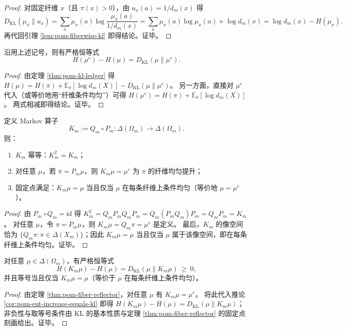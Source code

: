 \begin{proof}
对固定纤维 \(x\)（且 \(\pi(x)>0\)），由 \(u_x(a)=1/d_m(x)\) 得
\[
D_{\mathrm{KL}}(\mu_x\|u_x)
=\sum_{a}\mu_x(a)\log\frac{\mu_x(a)}{1/d_m(x)}
=\sum_a \mu_x(a)\log\mu_x(a)+\log d_m(x)
=\log d_m(x)-H(\mu_x).
\]
再代回引理 \ref{lem:pom-fiberwise-kl} 即得结论。证毕。
\end{proof}

\begin{corollary}\label{cor:pom-ent-increase-equals-kl}
沿用上述记号，则有严格恒等式
\[
\boxed{\;
H(\mu^e)-H(\mu)=D_{\mathrm{KL}}(\mu\|\mu^e).
\;}
\]
\end{corollary}
\begin{proof}
由定理 \ref{thm:pom-kl-ledger} 得
\(
H(\mu)=H(\pi)+\mathbb{E}_{\pi}[\log d_m(X)]-D_{\mathrm{KL}}(\mu\|\mu^e)
\)。
另一方面，直接对 $\mu^e$ 代入（或等价地用“纤维条件均匀”）可得
\(
H(\mu^e)=H(\pi)+\mathbb{E}_{\pi}[\log d_m(X)]
\)。
两式相减即得结论。证毕。
\end{proof}

\begin{theorem}\label{thm:pom-fiber-reflector}
定义 Markov 算子
\[
K_m:=Q_m\circ P_m:\Delta(\Omega_m)\to\Delta(\Omega_m).
\]
则：
\begin{enumerate}
  \item $K_m$ 幂等：$K_m^2=K_m$；
  \item 对任意 $\mu$，若 $\pi=P_m\mu$，则 $K_m\mu=\mu^e$ 为 $\pi$ 的纤维均匀提升；
  \item 固定点满足：$K_m\mu=\mu$ 当且仅当 $\mu$ 在每条纤维上条件均匀（等价地 $\mu=\mu^e$）。
\end{enumerate}
\end{theorem}
\begin{proof}
由 $P_m\circ Q_m=\mathrm{id}$ 得
\(
K_m^2=Q_mP_mQ_mP_m=Q_m(P_mQ_m)P_m=Q_mP_m=K_m
\)。
对任意 $\mu$，令 $\pi=P_m\mu$，则 $K_m\mu=Q_m\pi=\mu^e$ 是定义。
最后，$K_m$ 的像空间恰为 $\{Q_m\pi:\pi\in\Delta(X_m)\}$；因此 $K_m\mu=\mu$ 当且仅当 $\mu$ 属于该像空间，即在每条纤维上条件均匀。证毕。
\end{proof}

\begin{corollary}\label{cor:pom-second-law-Km}
对任意 $\mu\in\Delta(\Omega_m)$，有严格恒等式
\[
\boxed{\;
H(K_m\mu)-H(\mu)=D_{\mathrm{KL}}(\mu\|K_m\mu)\ \ge\ 0,
\;}
\]
并且等号当且仅当 $K_m\mu=\mu$（等价于 $\mu$ 在每条纤维上条件均匀）。
\end{corollary}
\begin{proof}
由定理 \ref{thm:pom-fiber-reflector}，对任意 $\mu$ 有 $K_m\mu=\mu^e$。
将此代入推论 \ref{cor:pom-ent-increase-equals-kl} 即得
\(
H(K_m\mu)-H(\mu)=D_{\mathrm{KL}}(\mu\|K_m\mu)
\)；
非负性与取等号条件由 KL 的基本性质与定理 \ref{thm:pom-fiber-reflector} 的固定点刻画给出。证毕。
\end{proof}

